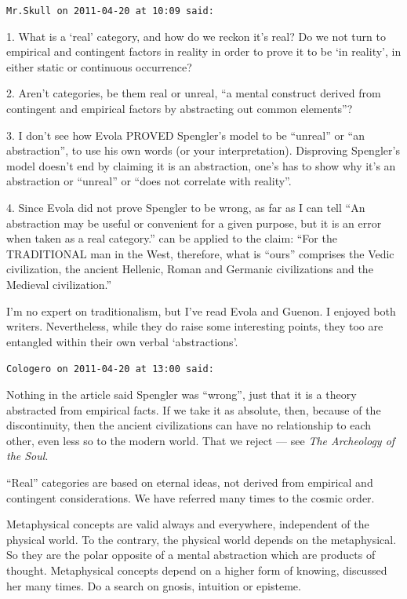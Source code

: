 \begin{footnotesize}
\begin{sffamily}
\texttt{Mr.Skull on 2011-04-20 at 10:09 said:}

1. What is a `real' category, and how do we reckon it's real? Do we not turn to empirical and contingent factors in reality in order to prove it to be `in reality', in either static or continuous occurrence?

2. Aren't categories, be them real or unreal, ``a mental construct derived from contingent and empirical factors by abstracting out common elements''?

3. I don't see how Evola PROVED Spengler's model to be ``unreal'' or ``an abstraction'', to use his own words (or your interpretation). Disproving Spengler's model doesn't end by claiming it is an abstraction, one's has to show why it's an abstraction or ``unreal'' or ``does not correlate with reality''.

4. Since Evola did not prove Spengler to be wrong, as far as I can tell ``An abstraction may be useful or convenient for a given purpose, but it is an error when taken as a real category.'' can be applied to the claim: ``For the TRADITIONAL man in the West, therefore, what is ``ours'' comprises the Vedic civilization, the ancient Hellenic, Roman and Germanic civilizations and the Medieval civilization.''

I'm no expert on traditionalism, but I've read Evola and Guenon. I enjoyed both writers. Nevertheless, while they do raise some interesting points, they too are entangled within their own verbal `abstractions'.

\hfill

\texttt{Cologero on 2011-04-20 at 13:00 said:}

Nothing in the article said Spengler was ``wrong'', just that it is a theory abstracted from empirical facts. If we take it as absolute, then, because of the discontinuity, then the ancient civilizations can have no relationship to each other, even less so to the modern world. That we reject --- see \textit{The Archeology of the Soul}.

``Real'' categories are based on eternal ideas, not derived from empirical and contingent considerations. We have referred many times to the cosmic order.

Metaphysical concepts are valid always and everywhere, independent of the physical world. To the contrary, the physical world depends on the metaphysical. So they are the polar opposite of a mental abstraction which are products of thought. Metaphysical concepts depend on a higher form of knowing, discussed her many times. Do a search on gnosis, intuition or episteme.


\end{sffamily}
\end{footnotesize}
